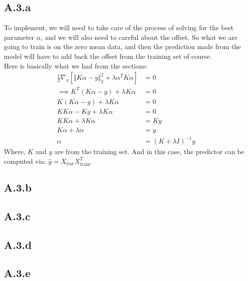 \documentclass[]{article}
\begin{document}
    \subsection*{A.3.a}
        To implement, we will need to take care of the process of solving for the best parameter $\alpha$, and we will also need to careful about the offset. So what we are going to train is on the zero mean data, and then the prediction made from the model will have to add back the offset from the training set of course. 
        \\
        Here is basically what we had from the sections: 
        \begin{align*}\tag{A.3.a}\label{eqn:A.3.a}
            \frac{1}{2}\nabla_x[\Vert K\alpha - y\Vert_2^2 + \lambda \alpha^T K \alpha] &= 0
            \\
            \implies K^T(K\alpha - y) + \lambda K\alpha &= 0
            \\
            K(K\alpha - y) + \lambda K\alpha &= 0
            \\
            KK\alpha - Ky + \lambda K\alpha &= 0
            \\
            KK\alpha + \lambda K\alpha &= Ky
            \\
            K \alpha + \lambda \alpha &= y
            \\
            \alpha &= (K + \lambda I)^{-1}y
        \end{align*}
        Where, $K$ and $y$ are from the training set. And in this case, the predictor can be computed via: $\hat{y} = X_\text{test}X^T_{\text{train}}$.
    \subsection*{A.3.b}
        
    \subsection*{A.3.c}

    \subsection*{A.3.d}

    \subsection*{A.3.e}
    
    
\end{document}
